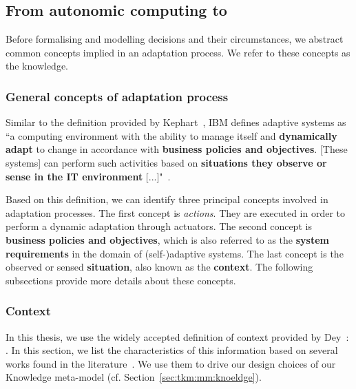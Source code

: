 \subsection{From autonomic computing to }

Before formalising and modelling decisions and their circumstances, we abstract common concepts implied in an adaptation process. We refer to these concepts as the knowledge.

\subsubsection{General concepts of adaptation process}

Similar to the definition provided by Kephart~\cite{DBLP:journals/computer/KephartC03}, IBM  defines adaptive systems as ``a computing environment with the ability to manage itself and \textbf{dynamically adapt} to change in accordance with \textbf{business policies and objectives}. [These systems] can perform such activities based on \textbf{situations they observe or sense in the IT environment} [...]"~\cite{computing2006architectural}.

Based on this definition, we can identify three principal concepts involved in adaptation processes.
The first concept is  \textit{actions}. They are executed in order to perform a dynamic adaptation through actuators.
The second concept is \textbf{business policies and objectives}, which is also referred to as the \textbf{system requirements} in the domain of (self-)adaptive systems.
The last concept is the observed or sensed \textbf{situation}, also known as the \textbf{context}.
The following subsections provide more details about these concepts.

\subsubsection{Context}

In this thesis, we use the widely accepted definition of context provided by \linebreak Dey~\cite{DBLP:journals/puc/Dey01}: .
In this section, we list the characteristics of this information based on several works found in the literature~\cite{DBLP:conf/pervasive/HenricksenIR02, DBLP:conf/seke/0001FNMKT14, DBLP:journals/percom/BettiniBHINRR10, DBLP:journals/comsur/PereraZCG14}.
We use them to drive our design choices of our Knowledge meta-model (cf. Section~\ref{sec:tkm:mm:knoeldge}).

